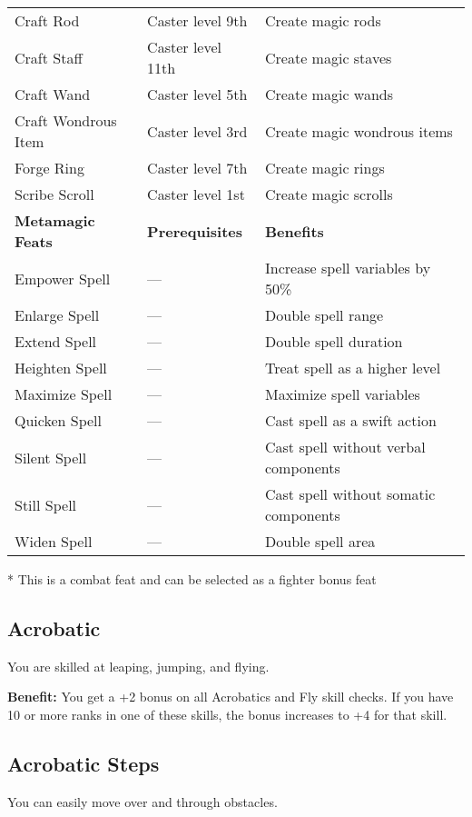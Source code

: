 \begin{table*}
\begin{tabularx}{\linewidth}{lXl}
Craft Rod & Caster level 9th & Create magic rods\\
Craft Staff & Caster level 11th & Create magic staves\\
Craft Wand & Caster level 5th & Create magic wands\\
Craft Wondrous Item & Caster level 3rd & Create magic wondrous items\\
Forge Ring & Caster level 7th & Create magic rings\\
Scribe Scroll & Caster level 1st & Create magic scrolls\\
\textbf{Metamagic Feats} & \textbf{Prerequisites} & \textbf{Benefits}\\
Empower Spell & --- & Increase spell variables by 50\%\\
Enlarge Spell & --- & Double spell range\\
Extend Spell & --- & Double spell duration\\
Heighten Spell & --- & Treat spell as a higher level\\
Maximize Spell & --- & Maximize spell variables\\
Quicken Spell & --- & Cast spell as a swift action\\
Silent Spell & --- & Cast spell without verbal components\\
Still Spell & --- & Cast spell without somatic components\\
Widen Spell & --- & Double spell area\\
\end{tabularx}
* This is a combat feat and can be selected as a fighter bonus feat
\end{table*}

				
\subsection{Acrobatic}

				
You are skilled at leaping, jumping, and flying.
				
\textbf{Benefit:} You get a +2 bonus on all Acrobatics and Fly skill checks. If you have 10 or more ranks in one of these skills, the bonus increases to +4 for that skill.
				
\subsection{Acrobatic Steps}

				
You can easily move over and through obstacles.
				
